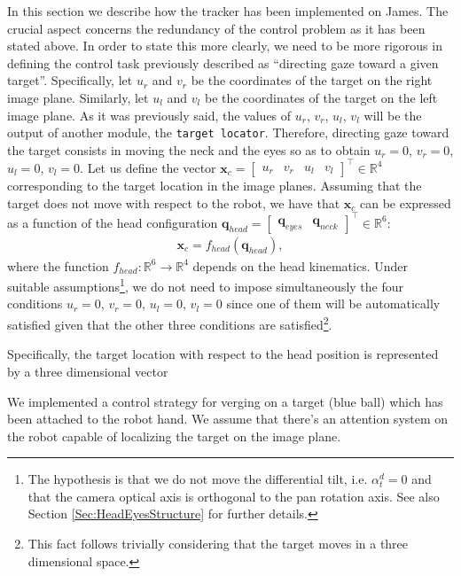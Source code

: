 In this section we describe how the tracker has been implemented on James. The crucial aspect concerns the redundancy of the control problem as it has been stated above. In order to state this more clearly, we need to be more rigorous in defining the control task previously described as ``directing gaze toward a given target''. Specifically, let $u_r$ and $v_r$ be the coordinates of the target on the right image plane. Similarly, let $u_l$ and $v_l$ be the coordinates of the target on the left image plane. As it was previously said, the values of $u_r$, $v_r$, $u_l$, $v_l$ will be the output of another module, the {\tt target locator}. Therefore, directing gaze toward the target consists in moving the neck and the eyes so as to obtain $u_r=0$, $v_r=0$, $u_l=0$, $v_l=0$. Let us define the vector $\mathbf x_c = \begin{bmatrix} u_r & v_r & u_l & v_l \end{bmatrix}^\top \in \mathbb R^4$ corresponding to the target location in the image planes. Assuming that the target does not move with respect to the robot, we have that $\mathbf x_c$ can be expressed as a function of the head configuration $\mathbf q_{head} = \begin{bmatrix} \mathbf q_{eyes} & \mathbf q_{neck} \end{bmatrix}^\top \in \mathbb R^6$:
\begin{eqnarray*}
\mathbf x_c = f_{head} (\mathbf q_{head}),
\end{eqnarray*}
where the function $f_{head} : \mathbb R^6 \longrightarrow \mathbb R^4$ depends on the head kinematics. Under suitable assumptions\footnote{The hypothesis is that we do not move the differential tilt, i.e. $\alpha_t^d = 0$ and that the camera optical axis is orthogonal to the pan rotation axis. See also Section \ref{Sec:HeadEyesStructure} for further details.}, we do not need to impose simultaneously the four conditions $u_r=0$, $v_r=0$, $u_l=0$, $v_l=0$ since one of them will be automatically satisfied given that the other three conditions are satisfied\footnote{This fact follows trivially considering that the target moves in a three dimensional space.}.   




Specifically, the target location with respect to the head position is represented by a three dimensional vector 

We implemented a control strategy for verging on a target (blue ball) which has been attached to the robot hand. We assume that there's an attention system on the robot capable of localizing the target on the image plane. 

